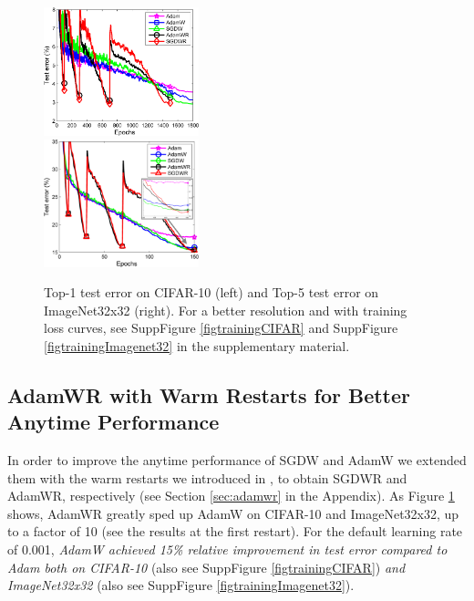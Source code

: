 \documentclass[usenames,dvipsnames]{article} %
\begin{document}
\begin{figure}[!t]
\begin{center}
	\includegraphics[width=0.4\textwidth]{restarts} $\;\;$~~~~~~~~~~~
  \includegraphics[width=0.4\textwidth]{restartImageNet_zoom}
\vspace*{-0.25cm}
\caption{\label{figrestarts} Top-1 test error on CIFAR-10 (left) and Top-5 test error on ImageNet32x32 (right). For a better resolution and with training loss curves, see SuppFigure \ref{figtrainingCIFAR} and SuppFigure \ref{figtrainingImagenet32} in the supplementary material.}%
\vspace*{-0.25cm}
\end{center}
\end{figure}





\subsection{AdamWR with Warm Restarts for Better Anytime Performance}
 

In order to improve the anytime performance of SGDW and AdamW we extended them with the warm restarts we introduced in \citet{loshchilov2016sgdr}, to obtain SGDWR and AdamWR, respectively (see Section \ref{sec:adamwr} in the Appendix). %
As Figure \ref{figrestarts} shows, AdamWR greatly sped up AdamW on CIFAR-10 and ImageNet32x32, up to a factor of 10 (see the results at the first restart).
For the default learning rate of 0.001, \emph{AdamW achieved 15\% relative improvement in test error compared to Adam both on CIFAR-10} (also see SuppFigure  \ref{figtrainingCIFAR}) \emph{and ImageNet32x32} %
(also see SuppFigure \ref{figtrainingImagenet32}). 
\end{document}
